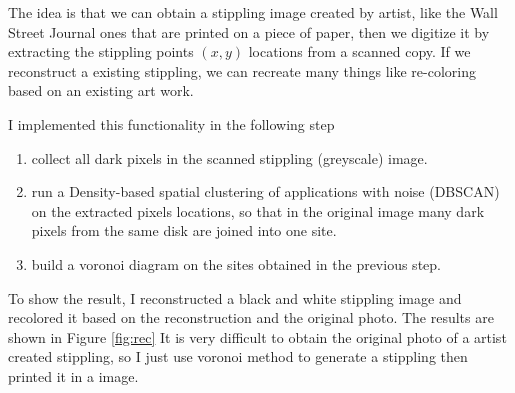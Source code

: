\documentclass[11pt]{article}
\begin{document}
The idea is that we can obtain a stippling image created by artist, like the Wall Street Journal ones that are printed on a piece of paper, then we digitize it by extracting the stippling points $(x,y)$ locations from a scanned copy. If we reconstruct a existing stippling, we can recreate many things like re-coloring based on an existing art work. 

I implemented this functionality in the following step
\begin{enumerate}
\item collect all dark pixels in the scanned stippling (greyscale) image.
\item run a Density-based spatial clustering of applications with noise (DBSCAN)\cite{ester} on the extracted pixels locations, so that in the original image many dark pixels from the same disk are joined into one site.
\item build a voronoi diagram on  the sites obtained in the previous step.
\end{enumerate}

To show the result, I reconstructed a black and white stippling image and recolored it based on the reconstruction and the original photo. The results are shown in Figure \ref{fig:rec} It is very difficult to obtain the original photo of a artist created stippling, so I just use voronoi method to generate a stippling then printed it in a image.
\end{document}
